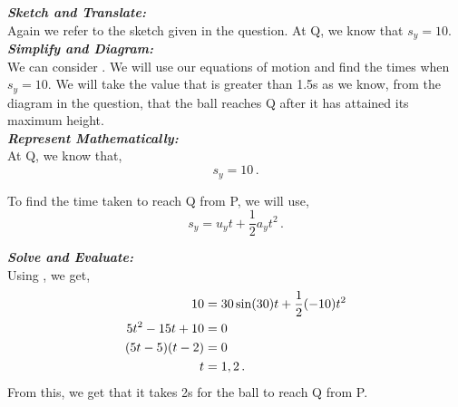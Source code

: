 \begin{subquestions}

\subquestion 

\textbf{\textit{Sketch and Translate:}} \\
Again we refer to the sketch given in the question. At Q, we know that $s_y=10$. \\




\textbf{\textit{Simplify and Diagram:}} \\ 
We can consider . We will use our equations of motion and find the times when $s_y=10$. We will take the value that is greater than 1.5s as we know, from the diagram in the question, that the ball reaches Q after it has attained its maximum height. \\




\textbf{\textit{Represent Mathematically:}} \\
At Q, we know that,
\begin{equation}
	s_y=10 \,.
\end{equation}

To find the time taken to reach Q from P, we will use,
\begin{equation}
	s_y = u_yt + \frac{1}{2}a_yt^2 \label{2005:q6:SEqn2} \,.
\end{equation}




\textbf{\textit{Solve and Evaluate:}} \\
Using , we get,
\begin{align}
	10 & = 30\sin(30)t + \frac{1}{2}(-10)t^2 \nonumber \\
	5t^2-15t+10 & = 0 \nonumber \\
	(5t-5)(t-2) & = 0 \nonumber \\
	t & = 1, 2 \,.
\end{align}
From this, we get that it takes 2s for the ball to reach Q from P. \\


\subquestion 


\end{subquestions}
